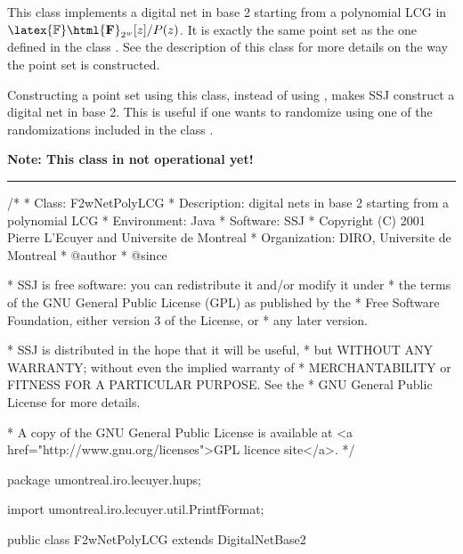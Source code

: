 

This class implements a digital net in base 2 starting from a
polynomial LCG in $\latex{\mathbb{F}}\html{\mathbf{F}}_{2^w}[z]/P(z)$.
 It is exactly the same
point set as the one defined in the class 
 .
 See the description
of this class for more details on the way the point set is constructed.

Constructing a point set using this class, instead of using
 ,
makes SSJ construct a digital net in base 2.  This is useful if one
wants to randomize using one of the randomizations included in the class
 .

\textbf{Note: This class in not operational yet!}

\bigskip\hrule\bigskip

\begin{code}
\begin{hide}
/*
 * Class:        F2wNetPolyLCG
 * Description:  digital nets in base 2 starting from a polynomial LCG 
 * Environment:  Java
 * Software:     SSJ 
 * Copyright (C) 2001  Pierre L'Ecuyer and Universite de Montreal
 * Organization: DIRO, Universite de Montreal
 * @author       
 * @since

 * SSJ is free software: you can redistribute it and/or modify it under
 * the terms of the GNU General Public License (GPL) as published by the
 * Free Software Foundation, either version 3 of the License, or
 * any later version.

 * SSJ is distributed in the hope that it will be useful,
 * but WITHOUT ANY WARRANTY; without even the implied warranty of
 * MERCHANTABILITY or FITNESS FOR A PARTICULAR PURPOSE.  See the
 * GNU General Public License for more details.

 * A copy of the GNU General Public License is available at
   <a href="http://www.gnu.org/licenses">GPL licence site</a>.
 */
\end{hide}
package umontreal.iro.lecuyer.hups; \begin{hide} 

import umontreal.iro.lecuyer.util.PrintfFormat;
\end{hide}

public class F2wNetPolyLCG extends DigitalNetBase2 \begin{hide} 
{
   private F2wStructure param;

    /**
     * Constructs and stores the set of cycles for an LCG with
     *    modulus <SPAN CLASS="MATH"><I>n</I></SPAN> and multiplier <SPAN CLASS="MATH"><I>a</I></SPAN>.
     *   If pgcd<SPAN CLASS="MATH">(<I>a</I>, <I>n</I>) = 1</SPAN>, this constructs a full-period LCG which has two
     *   cycles, one containing 0 and one, the LCG period.
     *
     * @param n required number of points and modulo of the LCG
     *
     *    @param a generator <SPAN CLASS="MATH"><I>a</I></SPAN> of the LCG
     *
     *
     */
\end{hide}
\end{code}

